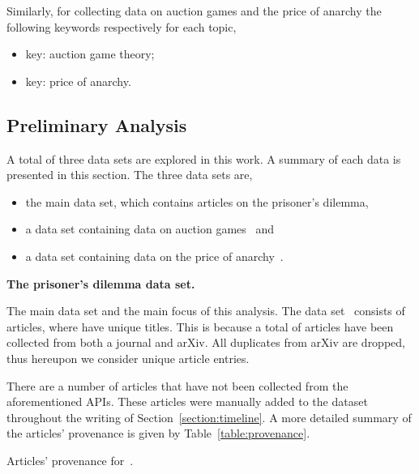 \documentclass{article}
\newcommand{\totalarticles}{}
\newcommand{\uniquetitles}{}
\newcommand{\numberofduplicates}{}
\newcommand{\manual}{}
\begin{document}
Similarly, for collecting data on auction games and the price of anarchy the
following keywords respectively for each topic,

\begin{itemize}
    \item key: auction game theory;
    \item key: price of anarchy.
\end{itemize}

\subsection{Preliminary Analysis}

A total of three data sets are explored in this work. A summary of each data is
presented in this section. The three data sets are,

\begin{itemize}
    \item the main data set, which contains articles on the prisoner's dilemma,~\cite{}
    \item a data set containing data on auction games~\cite{} and
    \item a data set containing data on the price of anarchy~\cite{}.
\end{itemize}

\textbf{The prisoner's dilemma data set.}

The main data set and the main focus of this analysis. The data set~\cite{}
consists of \totalarticles articles, where \uniquetitles have unique titles.
This is because a total of \numberofduplicates articles have been collected from
both a journal and arXiv. All duplicates from arXiv are dropped, thus hereupon
we consider \uniquetitles unique article entries.

There are a number of \manual articles that have not been collected from the
aforementioned APIs. These articles were manually added to the dataset throughout
the writing of Section~\ref{section:timeline}. A more detailed summary of the 
articles' provenance is given by Table~\ref{table:provenance}.

\begin{table}[!hbtp]
    \begin{center}
    
    \end{center}
    \caption{Articles' provenance for~\cite{}.}
    \label{table:provenance}
\end{table}
\end{document}
